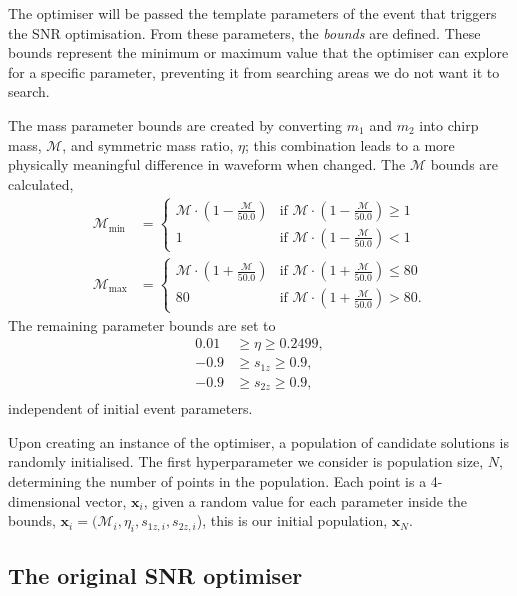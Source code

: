The optimiser will be passed the template parameters of the event that triggers the SNR optimisation. From these parameters, the \textit{bounds} are defined. These bounds represent the minimum or maximum value that the optimiser can explore for a specific parameter, preventing it from searching areas we do not want it to search.

The mass parameter bounds are created by converting $m_{1}$ and $m_{2}$ into chirp mass, $\mathcal{M}$, and symmetric mass ratio, $\eta$; this combination leads to a more physically meaningful difference in waveform when changed. The $\mathcal{M}$ bounds are calculated,
%
\begin{align}
    \mathcal{M}_{\min} &= 
    \begin{cases}
        \mathcal{M} \cdot \left(1 - \frac{\mathcal{M}}{50.0}\right) & \text{if } \mathcal{M} \cdot \left(1 - \frac{\mathcal{M}}{50.0}\right) \geq 1 \\
        1 & \text{if } \mathcal{M} \cdot \left(1 - \frac{\mathcal{M}}{50.0}\right) < 1
    \end{cases} \\
    \mathcal{M}_{\max} &= 
    \begin{cases}
        \mathcal{M} \cdot \left(1 + \frac{\mathcal{M}}{50.0}\right) & \text{if } \mathcal{M} \cdot \left(1 + \frac{\mathcal{M}}{50.0}\right) \leq 80 \\
        80 & \text{if } \mathcal{M} \cdot \left(1 + \frac{\mathcal{M}}{50.0}\right) > 80.
    \end{cases}
\end{align}
%
The remaining parameter bounds are set to
%
\begin{align}
    0.01 &\ge \eta \ge 0.2499, \\
    -0.9 &\ge s_{1z} \ge 0.9, \\
    -0.9 &\ge s_{2z} \ge 0.9, \\
\end{align}
%
independent of initial event parameters.

Upon creating an instance of the optimiser, a population of candidate solutions is randomly initialised. The first hyperparameter we consider is population size, $N$, determining the number of points in the population. Each point is a 4-dimensional vector, $\textbf{x}_{i}$, given a random value for each parameter inside the bounds, $\textbf{x}_{i} = (\mathcal{M}_{i}, \eta_{i}, s_{1z, i}, s_{2z, i}$), this is our initial population, $\textbf{x}_{N}$.

\subsection{\label{7:sec:original_de}The original SNR optimiser}

